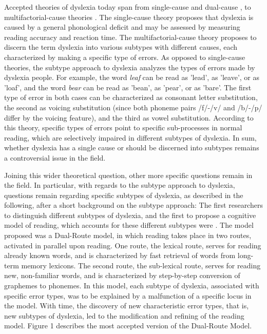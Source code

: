 Accepted theories of dyslexia today span from single-cause \citep{stanovich1988explaining, s98, s00} and dual-cause \citep{wolf1999double}, to multifactorial-cause theories \citep{ck12}. The single-cause theory proposes that dyslexia is caused by a general phonological deficit and may be assessed by measuring reading accuracy and reaction time. The multifactorial-cause theory proposes to discern the term dyslexia into various subtypes with different causes, each characterized by making a specific type of errors. As opposed to single-cause theories, the subtype approach to dyslexia analyzes the types of errors made by dyslexia people. For example, the word {\it leaf} can be read as 'lead', as 'leave', or as 'loaf', and the word {\it bear} can be read as 'bean', as 'pear', or as 'bare'. The first type of error in both cases can be characterized as consonant letter substitution, the second as voicing substitution (since both phoneme pairs /f/-/v/ and /b/-/p/ differ by the voicing feature), and the third as vowel substitution. According to this theory, specific types of errors point to specific sub-processes in normal reading, which are selectively impaired in different subtypes of dyslexia. In sum, whether dyslexia has a single cause or should be discerned into subtypes remains a controversial issue in the field.

Joining this wider theoretical question, other more specific questions remain in the field. In particular, with regards to the subtype approach to dyslexia, questions remain regarding specific subtypes of dyslexia, as described in the following, after a short background on the subtype approach: The first researchers to distinguish different subtypes of dyslexia, and the first to propose a cognitive model of reading, which accounts for these different subtypes were \citet{mn73}. The model proposed was a Dual-Route model, in which reading takes place in two routes, activated in parallel upon reading. One route, the lexical route, serves for reading already known words, and is characterized by fast retrieval of words from long-term memory lexicons. The second route, the sub-lexical route, serves for reading new, non-familiar words, and is characterized by step-by-step conversion of graphemes to phonemes. In this model, each subtype of dyslexia, associated with specific error types, was to be explained by a malfunction of a specific locus in the model. With time, the discovery of new characteristic error types, that is, new subtypes of dyslexia, led to the modification and refining of the reading model. Figure 1 describes the most accepted version of the Dual-Route Model. 

